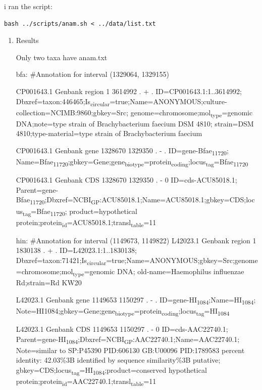\documentclass[11pt]{article}
\begin{document}
i ran the script:
\begin{verbatim}
bash ../scripts/anam.sh < ../data/list.txt
\end{verbatim}
\begin{enumerate}
\item Results
\label{sec:org64c9b33}

Only two taxa have anam.txt

bfa:
\#Annotation for interval (1329064, 1329155)

CP001643.1	Genbank	region	1	3614992	.	+	.	ID=CP001643.1:1..3614992;
Dbxref=taxon:446465;Is\textsubscript{circular}=true;Name=ANONYMOUS;culture-collection=NCIMB:9860;gbkey=Src;
genome=chromosome;mol\textsubscript{type}=genomic DNA;note=type strain of Brachybacterium faecium DSM 4810;
strain=DSM 4810;type-material=type strain of Brachybacterium faecium

CP001643.1	Genbank	gene	1328670	1329350	.	-	.	ID=gene-Bfae\textsubscript{11720};
Name=Bfae\textsubscript{11720};gbkey=Gene;gene\textsubscript{biotype}=protein\textsubscript{coding};locus\textsubscript{tag}=Bfae\textsubscript{11720}

CP001643.1	Genbank	CDS	1328670	1329350	.	-	0	ID=cds-ACU85018.1;
Parent=gene-Bfae\textsubscript{11720};Dbxref=NCBI\textsubscript{GP}:ACU85018.1;Name=ACU85018.1;gbkey=CDS;locus\textsubscript{tag}=Bfae\textsubscript{11720};
product=hypothetical protein;protein\textsubscript{id}=ACU85018.1;transl\textsubscript{table}=11

hin:
\#Annotation for interval (1149673, 1149822)
L42023.1        Genbank region  1       1830138 .       +       .       ID=L42023.1:1..1830138;
Dbxref=taxon:71421;Is\textsubscript{circular}=true;Name=ANONYMOUS;gbkey=Src;genome=chromosome;mol\textsubscript{type}=genomic DNA;
old-name=Haemophilus influenzae Rd;strain=Rd KW20

L42023.1        Genbank gene    1149653 1150297 .       -       .       ID=gene-HI\textsubscript{1084};Name=HI\textsubscript{1084};
Note=HI1084;gbkey=Gene;gene\textsubscript{biotype}=protein\textsubscript{coding};locus\textsubscript{tag}=HI\textsubscript{1084}

L42023.1        Genbank CDS     1149653 1150297 .       -       0       ID=cds-AAC22740.1;
Parent=gene-HI\textsubscript{1084};Dbxref=NCBI\textsubscript{GP}:AAC22740.1;Name=AAC22740.1;
Note=similar to SP:P45390 PID:606130 GB:U00096 PID:1789583 percent identity: 42.03\%3B identified by sequence similarity\%3B putative;
gbkey=CDS;locus\textsubscript{tag}=HI\textsubscript{1084};product=conserved hypothetical protein;protein\textsubscript{id}=AAC22740.1;transl\textsubscript{table}=11
\end{enumerate}
\end{document}
